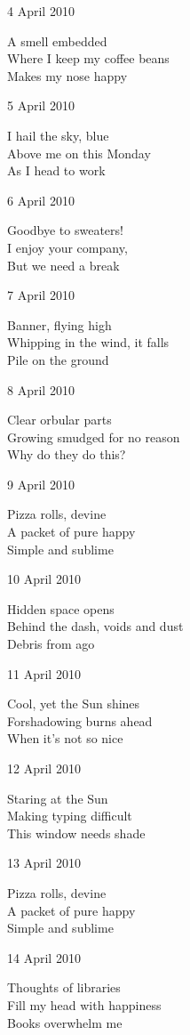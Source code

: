 \documentclass[12pt]{article}
\begin{document}
4 April 2010

A smell embedded \\
Where I keep my coffee beans \\
Makes my nose happy

5 April 2010

I hail the sky, blue \\
Above me on this Monday \\
As I head to work

6 April 2010

Goodbye to sweaters! \\
I enjoy your company, \\
But we need a break

7 April 2010

Banner, flying high \\
Whipping in the wind, it falls \\
Pile on the ground

8 April 2010

Clear orbular parts \\
Growing smudged for no reason \\
Why do they do this?

9 April 2010

Pizza rolls, devine \\
A packet of pure happy \\
Simple and sublime

\newpage

10 April 2010

Hidden space opens \\
Behind the dash, voids and dust \\
Debris from ago

11 April 2010

Cool, yet the Sun shines \\
Forshadowing burns ahead \\
When it's not so nice

12 April 2010

Staring at the Sun \\
Making typing difficult \\
This window needs shade

13 April 2010

Pizza rolls, devine \\
A packet of pure happy \\
Simple and sublime

14 April 2010

Thoughts of libraries \\
Fill my head with happiness \\
Books overwhelm me
\end{document}
